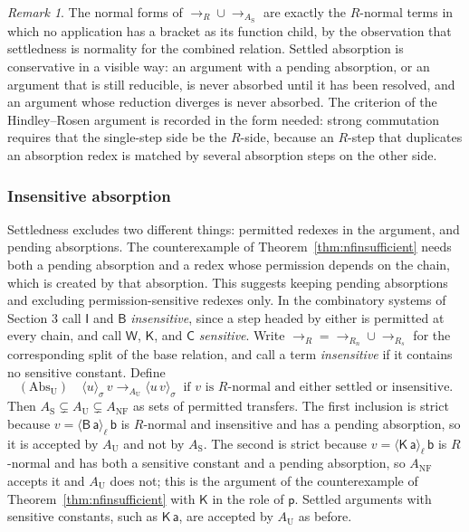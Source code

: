 \documentclass[11pt]{article}
\theoremstyle{definition}
\theoremstyle{remark}
\newtheorem{remark}[theorem]{Remark}
\newcommand{\cI}{\mathsf{I}}
\newcommand{\cB}{\mathsf{B}}
\newcommand{\cC}{\mathsf{C}}
\newcommand{\cK}{\mathsf{K}}
\newcommand{\cW}{\mathsf{W}}
\newcommand{\br}[2]{\langle #1\rangle_{#2}}
\begin{document}
\begin{remark}
The normal forms of $\to_R\cup\to_{A_{\mathrm S}}$ are exactly the $R$-normal terms in which no application has a bracket as its function child, by the observation that settledness is normality for the combined relation. Settled absorption is conservative in a visible way: an argument with a pending absorption, or an argument that is still reducible, is never absorbed until it has been resolved, and an argument whose reduction diverges is never absorbed. The criterion of the Hindley--Rosen argument is recorded in the form needed: strong commutation requires that the single-step side be the $R$-side, because an $R$-step that duplicates an absorption redex is matched by several absorption steps on the other side.
\end{remark}

\subsubsection*{Insensitive absorption}

Settledness excludes two different things: permitted redexes in the argument, and pending absorptions. The counterexample of Theorem~\ref{thm:nfinsufficient} needs both a pending absorption and a redex whose permission depends on the chain, which is created by that absorption. This suggests keeping pending absorptions and excluding permission-sensitive redexes only. In the combinatory systems of Section 3 call $\cI$ and $\cB$ \emph{insensitive}, since a step headed by either is permitted at every chain, and call $\cW$, $\cK$, and $\cC$ \emph{sensitive}. Write $\to_R=\to_{R_n}\cup\to_{R_s}$ for the corresponding split of the base relation, and call a term \emph{insensitive} if it contains no sensitive constant. Define
\[
(\mathrm{Abs}_{\mathrm U})\quad \br u\sigma\,v\to_{A_{\mathrm U}}\br{u\,v}\sigma\ \text{ if $v$ is $R$-normal and either settled or insensitive.}
\]
Then $A_{\mathrm S}\subsetneq A_{\mathrm U}\subsetneq A_{\mathrm{NF}}$ as sets of permitted transfers. The first inclusion is strict because $v=\br{\cB\,\mathsf a}\ell\,\mathsf b$ is $R$-normal and insensitive and has a pending absorption, so it is accepted by $A_{\mathrm U}$ and not by $A_{\mathrm S}$. The second is strict because $v=\br{\cK\,\mathsf a}\ell\,\mathsf b$ is $R$-normal and has both a sensitive constant and a pending absorption, so $A_{\mathrm{NF}}$ accepts it and $A_{\mathrm U}$ does not; this is the argument of the counterexample of Theorem~\ref{thm:nfinsufficient} with $\cK$ in the role of $\mathsf p$. Settled arguments with sensitive constants, such as $\cK\,\mathsf a$, are accepted by $A_{\mathrm U}$ as before.
\end{document}
